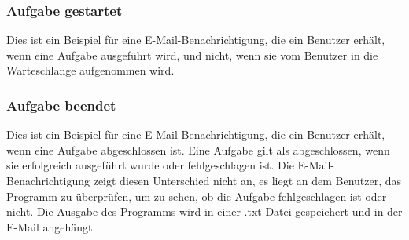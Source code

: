 \documentclass[a4paper,12pt]{article}
\begin{document}
\subsubsection{Aufgabe gestartet}
Dies ist ein Beispiel für eine E-Mail-Benachrichtigung, die ein \gls{Benutzer} erhält, wenn eine \gls{Aufgabe} ausgeführt wird, und nicht, wenn sie vom \gls{Benutzer} in die \gls{Warteschlange} aufgenommen wird. \\
\begin{center}
\end{center}

\clearpage
\subsubsection{Aufgabe beendet}
Dies ist ein Beispiel für eine E-Mail-Benachrichtigung, die ein \gls{Benutzer} erhält, wenn eine \gls{Aufgabe} abgeschlossen ist. Eine \gls{Aufgabe} gilt als abgeschlossen, wenn sie erfolgreich ausgeführt wurde oder fehlgeschlagen ist. Die E-Mail-Benachrichtigung zeigt diesen Unterschied nicht an, es liegt an dem \gls{Benutzer}, das Programm zu überprüfen, um zu sehen, ob die \gls{Aufgabe} fehlgeschlagen ist oder nicht. Die Ausgabe des Programms wird in einer .txt-Datei gespeichert und in der E-Mail angehängt. \\
\end{document}
